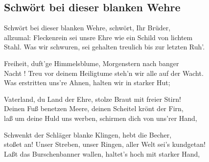 
\subsection*{Schwört bei dieser blanken Wehre}
%


\thestrophe Schwört bei dieser blanken Wehre, schwört, Ihr Brüder, \\
allzumal: Fleckenrein sei unsre Ehre wie ein Schild von lichtem \\
Stahl. Was wir schwuren, sei gehalten treulich bis zur letzten Ruh'. \\

\thestrophe Freiheit, duft'ge Himmelsblume, Morgenstern nach banger \\
Nacht ! Treu vor deinem Heiligtume steh'n wir alle auf der Wacht. \\
Was erstritten uns're Ahnen, halten wir in starker Hut; \\

\thestrophe Vaterland, du Land der Ehre, stolze Braut mit freier Stirn! \\
Deinen Fuß benetzen Meere, deinen Scheitel krönt der Firn, \\
laß um deine Huld uns werben, schirmen dich von uns'rer Hand, \\

\thestrophe Schwenkt der Schläger blanke Klingen, hebt die Becher, \\
stoßet an! Unser Streben, unser Ringen, aller Welt sei's kundgetan! \\
Laßt das Burschenbanner wallen, haltet's hoch mit starker Hand, \\
